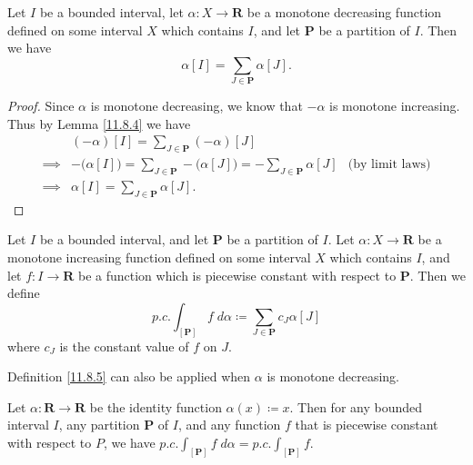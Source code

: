 \begin{additional corollary}\label{ac 11.8.3}
Let \(I\) be a bounded interval, let \(\alpha : X \to \mathbf{R}\) be a monotone decreasing function defined on some interval \(X\) which contains \(I\), and let \(\mathbf{P}\) be a partition of \(I\).
Then we have
\[
    \alpha[I] = \sum_{J \in \mathbf{P}} \alpha[J].
\]
\end{additional corollary}

\begin{proof}
    Since \(\alpha\) is monotone decreasing, we know that \(-\alpha\) is monotone increasing.
    Thus by Lemma \ref{11.8.4} we have
    \begin{align*}
                 & (-\alpha)[I] = \sum_{J \in \mathbf{P}} (-\alpha)[J]                                                                               \\
        \implies & -\big(\alpha[I]\big) = \sum_{J \in \mathbf{P}} -\big(\alpha[J]\big) = -\sum_{J \in \mathbf{P}} \alpha[J] & \text{(by limit laws)} \\
        \implies & \alpha[I] = \sum_{J \in \mathbf{P}} \alpha[J].
    \end{align*}
\end{proof}

\begin{definition}\label{11.8.5}
    Let \(I\) be a bounded interval, and let \(\mathbf{P}\) be a partition of \(I\).
    Let \(\alpha : X \to \mathbf{R}\) be a monotone increasing function defined on some interval \(X\) which contains \(I\), and let \(f : I \to \mathbf{R}\) be a function which is piecewise constant with respect to \(\mathbf{P}\).
    Then we define
    \[
        p.c. \int_{[\mathbf{P}]} f \; d \alpha \coloneqq \sum_{J \in \mathbf{P}} c_J \alpha[J]
    \]
    where \(c_J\) is the constant value of \(f\) on \(J\).
\end{definition}

\begin{note}
    Definition \ref{11.8.5} can also be applied when \(\alpha\) is monotone decreasing.
\end{note}

\setcounter{theorem}{6}
\begin{example}\label{11.8.7}
    Let \(\alpha : \mathbf{R} \to \mathbf{R}\) be the identity function \(\alpha(x) \coloneqq x\).
    Then for any bounded interval \(I\), any partition \(\mathbf{P}\) of \(I\), and any function \(f\) that is piecewise constant with respect to \(P\), we have \(p.c. \int_{[\mathbf{P}]} f \; d \alpha = p.c. \int_{[\mathbf{P}]} f\).
\end{example}

